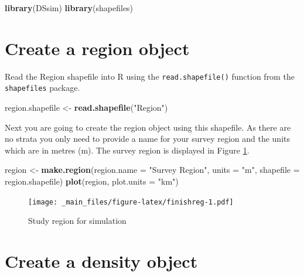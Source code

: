 \documentclass[]{book}
\newenvironment{Shaded}{\begin{snugshade}}{\end{snugshade}}
\newcommand{\KeywordTok}[1]{\textcolor[rgb]{0.13,0.29,0.53}{\textbf{#1}}}
\newcommand{\DataTypeTok}[1]{\textcolor[rgb]{0.13,0.29,0.53}{#1}}
\newcommand{\StringTok}[1]{\textcolor[rgb]{0.31,0.60,0.02}{#1}}
\newcommand{\NormalTok}[1]{#1}
\theoremstyle{definition}
\theoremstyle{definition}
\theoremstyle{remark}
\begin{document}
\begin{Shaded}
\begin{Highlighting}[]
\KeywordTok{library}\NormalTok{(DSsim)}
\KeywordTok{library}\NormalTok{(shapefiles)}
\end{Highlighting}
\end{Shaded}

\section{Create a region object}\label{create-a-region-object}

Read the Region shapefile into R using the \texttt{read.shapefile()}
function from the \texttt{shapefiles} package.

\begin{Shaded}
\begin{Highlighting}[]
\NormalTok{region.shapefile <-}\StringTok{ }\KeywordTok{read.shapefile}\NormalTok{(}\StringTok{"Region"}\NormalTok{)}
\end{Highlighting}
\end{Shaded}

Next you are going to create the region object using this shapefile. As
there are no strata you only need to provide a name for your survey
region and the units which are in metres (m). The survey region is
displayed in Figure \ref{fig:finishreg}.

\begin{Shaded}
\begin{Highlighting}[]
\NormalTok{region <-}\StringTok{ }\KeywordTok{make.region}\NormalTok{(}\DataTypeTok{region.name =} \StringTok{"Survey Region"}\NormalTok{, }\DataTypeTok{units =} \StringTok{"m"}\NormalTok{, }
                      \DataTypeTok{shapefile =}\NormalTok{ region.shapefile)}
\KeywordTok{plot}\NormalTok{(region, }\DataTypeTok{plot.units =} \StringTok{"km"}\NormalTok{)}
\end{Highlighting}
\end{Shaded}

\begin{figure}
\centering
\texttt{[image: \_main\_files/figure-latex/finishreg-1.pdf]}
\caption{\label{fig:finishreg}Study region for simulation}
\end{figure}

\section{Create a density object}\label{create-a-density-object}
\end{document}
